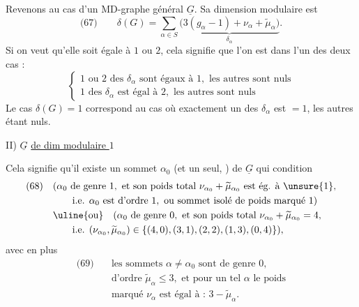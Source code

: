 Revenons au cas d'un MD-graphe général $\underline G$. Sa dimension modulaire est
\[
\text{(67)}\qquad\delta(G)=\sum_{\alpha\in S}\underbrace{\bigl(3(g_\alpha-1)+\nu_\alpha+\widetilde\mu_\alpha\bigr)}_{\delta_\alpha}.
\]
Si on veut qu'elle soit égale à $1$ ou $2$, cela signifie que l'on est dans l'un des deux cas :
\[
\left\{\begin{array}{l}
1\text{ ou }2\text{ des }\delta_\alpha\text{ sont égaux à }1,\text{ les autres sont nuls}\\
1\text{ des }\delta_\alpha\text{ est égal à }2,\text{ les autres sont nuls}
\end{array}\right.
\]
Le cas $\delta(G)=1$ correspond au cas où exactement un des $\delta_\alpha$ est $=1$, les autres étant nuls.

II) $\underline G$ \uline{de dim modulaire $1$}

Cela signifie qu'il existe un sommet $\alpha_0$ (et un seul, ) de $\underline G$ qui   condition
\[
\begin{aligned}
\text{(68)}\quad &(\alpha_0\text{ de genre }1,\text{ et son poids total }\nu_{\alpha_0}+\widetilde\mu_{\alpha_0}\text{ est ég. à }\unsure{1},\\
&\qquad\text{i.e. }\alpha_0\text{ est d'ordre }1,\text{ ou sommet isolé de poids marqué }1)\\
&\uline{\text{ou}}\quad(\alpha_0\text{ de genre }0,\text{ et son poids total }\nu_{\alpha_0}+\widetilde\mu_{\alpha_0}=4,\\
&\qquad\text{i.e. }(\nu_{\alpha_0},\widetilde\mu_{\alpha_0})\in\{(4,0),(3,1),(2,2),(1,3),(0,4)\}),
\end{aligned}
\]
avec en plus
\[
\begin{aligned}
\text{(69)}\quad&\text{les sommets }\alpha\ne\alpha_0\text{ sont de genre }0,\\
&\text{d'ordre }\widetilde\mu_\alpha\leq3,\text{ et pour un tel }\alpha\text{ le poids}\\
&\text{marqué }\nu_\alpha\text{ est égal à : }3-\widetilde\mu_\alpha.
\end{aligned}
\]
